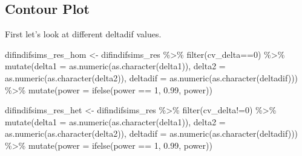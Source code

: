 \documentclass[
]{article}
\newenvironment{Shaded}{\begin{snugshade}}{\end{snugshade}}
\newcommand{\AttributeTok}[1]{\textcolor[rgb]{0.77,0.63,0.00}{#1}}
\newcommand{\DecValTok}[1]{\textcolor[rgb]{0.00,0.00,0.81}{#1}}
\newcommand{\FloatTok}[1]{\textcolor[rgb]{0.00,0.00,0.81}{#1}}
\newcommand{\FunctionTok}[1]{\textcolor[rgb]{0.00,0.00,0.00}{#1}}
\newcommand{\NormalTok}[1]{#1}
\newcommand{\OtherTok}[1]{\textcolor[rgb]{0.56,0.35,0.01}{#1}}
\newcommand{\SpecialCharTok}[1]{\textcolor[rgb]{0.00,0.00,0.00}{#1}}
\begin{document}
\hypertarget{contour-plot}{%
\subsection{Contour Plot}\label{contour-plot}}

First let's look at different deltadif values.

\begin{Shaded}
\begin{Highlighting}[]
\NormalTok{difindifsims\_res\_hom }\OtherTok{\textless{}{-}}\NormalTok{ difindifsims\_res }\SpecialCharTok{\%\textgreater{}\%} 
  \FunctionTok{filter}\NormalTok{(cv\_delta}\SpecialCharTok{==}\DecValTok{0}\NormalTok{) }\SpecialCharTok{\%\textgreater{}\%} 
  \FunctionTok{mutate}\NormalTok{(}\AttributeTok{delta1 =} \FunctionTok{as.numeric}\NormalTok{(}\FunctionTok{as.character}\NormalTok{(delta1)),}
         \AttributeTok{delta2 =} \FunctionTok{as.numeric}\NormalTok{(}\FunctionTok{as.character}\NormalTok{(delta2)),}
         \AttributeTok{deltadif =} \FunctionTok{as.numeric}\NormalTok{(}\FunctionTok{as.character}\NormalTok{(deltadif))) }\SpecialCharTok{\%\textgreater{}\%} 
  \FunctionTok{mutate}\NormalTok{(}\AttributeTok{power =} \FunctionTok{ifelse}\NormalTok{(power }\SpecialCharTok{==} \DecValTok{1}\NormalTok{, }\FloatTok{0.99}\NormalTok{, power)) }

\NormalTok{difindifsims\_res\_het }\OtherTok{\textless{}{-}}\NormalTok{ difindifsims\_res }\SpecialCharTok{\%\textgreater{}\%} 
  \FunctionTok{filter}\NormalTok{(cv\_delta}\SpecialCharTok{!=}\DecValTok{0}\NormalTok{) }\SpecialCharTok{\%\textgreater{}\%} 
  \FunctionTok{mutate}\NormalTok{(}\AttributeTok{delta1 =} \FunctionTok{as.numeric}\NormalTok{(}\FunctionTok{as.character}\NormalTok{(delta1)),}
         \AttributeTok{delta2 =} \FunctionTok{as.numeric}\NormalTok{(}\FunctionTok{as.character}\NormalTok{(delta2)),}
         \AttributeTok{deltadif =} \FunctionTok{as.numeric}\NormalTok{(}\FunctionTok{as.character}\NormalTok{(deltadif))) }\SpecialCharTok{\%\textgreater{}\%} 
  \FunctionTok{mutate}\NormalTok{(}\AttributeTok{power =} \FunctionTok{ifelse}\NormalTok{(power }\SpecialCharTok{==} \DecValTok{1}\NormalTok{, }\FloatTok{0.99}\NormalTok{, power)) }


\end{Highlighting}
\end{Shaded}
\end{document}
